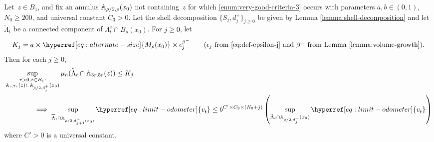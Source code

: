 \documentclass[12pt]{amsart}
\numberwithin{equation}{section}
\newcommand{\cluster}[2]{\hyperref[eq:non-co-set]{\mathit{\Lambda}^{#1}_{#2}}}
\newcommand{\odometer}[2]{\hyperref[eq:limit-odometer]{v^{#1}_{#2}}}
\newcommand{\Mrho}[2]{\hyperref[eq:alternate-size]{M_{#1}(#2)}}
\begin{document}
	\begin{lemma} \label{lemma:low-mass-implies-small-odometer}
		Let~$z \in B_1$, and fix an annulus $\mathbb{A}_{\rho/2,\rho}(x_0)$ not containing~$z$ for which \ref{enum:very-good-criteria-3} occurs
		with parameters $a,b \in (0,1)$, $N_0 \geq 200$, and universal constant $C_3 > 0$. Let the shell decomposition $\{S_j, d^+_j\}_{j \geq 0}$ be given by Lemma \ref{lemma:shell-decomposition} and let $\widetilde \Lambda_t$ be a connected component of ${\cluster{z}{t}} \cap B_{\rho}(x_0)$. 
		For $j\geq 0$, let
		\begin{equation} \label{eq:k-j-parameter}
		K_j = a \times \Mrho{\rho}{x_0} \times \epsilon^{\beta^-}_j \qquad \mbox{($\epsilon_j$ from \eqref{eq:def-epsilon-j} and $\beta^-$ from Lemma \ref{lemma:volume-growth})} .
		\end{equation}
		Then for each $j\geq 0$,
		\begin{align} \label{eq:low-mass-small-odometer}
		& \sup_{\substack{r > 0 , z \in B_1 : \\ \A_{r, 7r}(z) \subset \A_{\rho/2, d^+_j}(x_0)}}  \mu_h(\widetilde \Lambda_t \cap \A_{3r, 5r}(z)) \leq K_j \notag \\
		&\qquad\qquad \implies 
		\sup_{\widetilde \Lambda_t \cap \A_{\rho/2, d^+_{j+1}(x_0)}} \odometer{}{t}  \leq  b^{C' \times C_3 \times (N_0 + j)}  \left( \sup_{\tilde \Lambda_t \cap \A_{\rho/2, d^+_j}(x_0)} \odometer{}{t} \right)
		\end{align}
		where $C' > 0$ is a universal constant.
	\end{lemma} 
\end{document}
